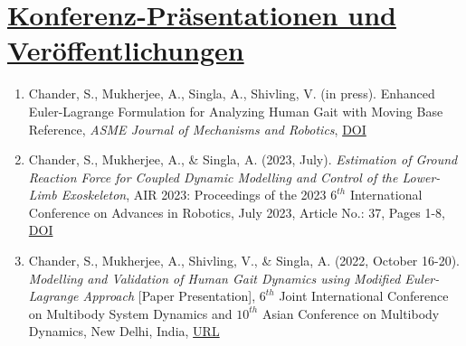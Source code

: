 \section{\underline{Konferenz-Präsentationen und Veröffentlichungen}}
\begin{enumerate}
	\item Chander, S., Mukherjee, A., Singla, A., Shivling, V. (in press). Enhanced Euler-Lagrange Formulation for Analyzing Human Gait with Moving Base Reference, \emph{ASME Journal of Mechanisms and Robotics}, \href{https://doi.org/10.1115/1.4065520}{\large DOI}
	\item Chander, S., Mukherjee, A., \& Singla, A. (2023, July). \emph{Estimation of Ground Reaction Force for Coupled Dynamic Modelling and Control of the Lower-Limb Exoskeleton}, AIR 2023: Proceedings of the 2023 $6^{th}$ International Conference on Advances in Robotics, July 2023, Article No.: 37, Pages 1-8, \href{https://doi.org/10.1145/3610419.3610456  }{\large{DOI}}
	\item Chander, S., Mukherjee, A., Shivling, V., \& Singla, A. (2022, October 16-20). \emph{Modelling and Validation of Human Gait Dynamics using Modified Euler-Lagrange Approach} [Paper Presentation], $6^{th}$ Joint International Conference on Multibody System Dynamics and $10^{th}$ Asian Conference on Multibody Dynamics, New Delhi, India, \href{http://imsdacmd2020.iitd.ac.in/web-abstracts/pdf/WEB_ABSTRACTS/IMSDACMD2020_219.pdf}{\large{URL}}
\end{enumerate}
